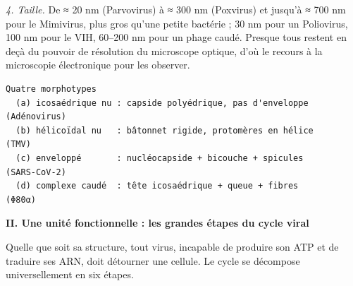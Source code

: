 \documentclass[11pt,a4paper]{article}
\begin{document}
\emph{4. Taille.} De ≈ 20 nm (Parvovirus) à ≈ 300 nm (Poxvirus) et jusqu'à ≈ 700 nm pour le Mimivirus, plus gros qu'une petite bactérie ; 30 nm pour un Poliovirus, 100 nm pour le VIH, 60--200 nm pour un phage caudé. Presque tous restent en deçà du pouvoir de résolution du microscope optique, d'où le recours à la microscopie électronique pour les observer.

\begin{lstlisting}
Quatre morphotypes
  (a) icosaédrique nu : capside polyédrique, pas d'enveloppe        (Adénovirus)
  (b) hélicoïdal nu   : bâtonnet rigide, protomères en hélice        (TMV)
  (c) enveloppé       : nucléocapside + bicouche + spicules          (SARS-CoV-2)
  (d) complexe caudé  : tête icosaédrique + queue + fibres           (Φ80α)
\end{lstlisting}

\textbf{II. Une unité fonctionnelle : les grandes étapes du cycle viral}

Quelle que soit sa structure, tout virus, incapable de produire son ATP et de traduire ses ARN, doit détourner une cellule. Le cycle se décompose universellement en six étapes.
\end{document}

